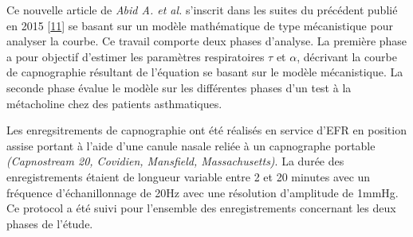 \documentclass[12pt,]{article}
\begin{document}
Ce nouvelle article de \emph{Abid A. et al.} s'inscrit dans les suites
du précédent publié en 2015
{[}\protect\hyperlink{ref-abid2015model}{11}{]} se basant sur un modèle
mathématique de type mécanistique pour analyser la courbe. Ce travail
comporte deux phases d'analyse. La première phase a pour objectif
d'estimer les paramètres respiratoires \(\tau\) et \(\alpha\), décrivant
la courbe de capnographie résultant de l'équation se basant sur le
modèle mécanistique. La seconde phase évalue le modèle sur les
différentes phases d'un test à la métacholine chez des patients
asthmatiques.

Les enregsitrements de capnographie ont été réalisés en service d'EFR en
position assise portant à l'aide d'une canule nasale reliée à un
capnographe portable \emph{(Capnostream 20, Covidien, Mansfield,
Massachusetts)}. La durée des enregistrements étaient de longueur
variable entre 2 et 20 minutes avec un fréquence d'échanillonnage de
20Hz avec une résolution d'amplitude de 1mmHg. Ce protocol a été suivi
pour l'ensemble des enregistrements concernant les deux phases de
l'étude.
\end{document}
